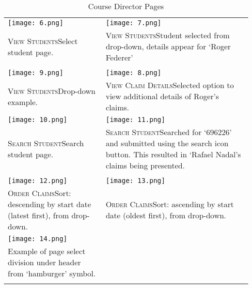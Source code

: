 \documentclass[11pt, english]{article}
\begin{document}
	\begin{center}
                \scriptsize
        \begin{longtable}{p{7cm}p{7cm}}
		\texttt{[image: 6.png]} & \texttt{[image: 7.png]}\\
		\textsc{View Students}\newline Select student page. & \textsc{View Students}\newline Student selected from drop-down, details appear for `Roger Federer'\\
		& \\
		\texttt{[image: 9.png]} & \texttt{[image: 8.png]}\\
		  \textsc{View Students}\newline Drop-down example. & \textsc{View Claim Details}\newline Selected option to view additional details of Roger's claims.\\
		 \texttt{[image: 10.png]} & \texttt{[image: 11.png]}\\
		 \textsc{Search Student}\newline Search student page. & \textsc{Search Student}\newline Searched for `696226' and submitted using the search icon button. This resulted in `Rafael Nadal's claims being presented.\\
		 & \\
		\texttt{[image: 12.png]} & \texttt{[image: 13.png]}\\
		\textsc{Order Claims}\newline Sort: descending by start date (latest first), from drop-down. & \textsc{Order Claims}\newline Sort: ascending by start date (oldest first), from drop-down.\\
		\texttt{[image: 14.png]} & \\
		Example of page select division under header from `hamburger' symbol. & \\
                \caption{Course Director Pages}
        \end{longtable}
        \end{center}

\newpage
	
\end{document}
